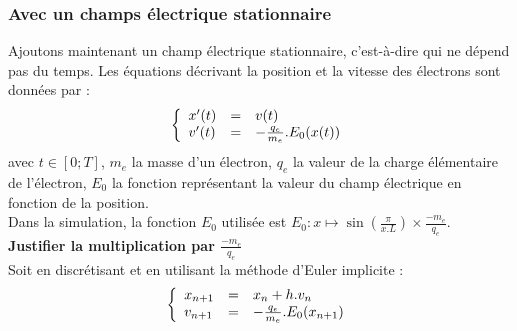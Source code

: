 \documentclass{article}
\begin{document}
\subsubsection*{Avec un champs électrique stationnaire}
Ajoutons maintenant un champ électrique stationnaire, c'est-à-dire qui ne dépend pas du temps. Les équations décrivant la position et la vitesse des électrons sont données par :
$$
\left \{
   \begin{array}{l l l}
      x'(t)  & = & v(t) \\
      v'(t)  & = & -\frac{q_e}{m_e}.E_0(x(t)) \\
	\end{array}
\right.
$$
avec $t \in [0;T]$, $m_e$ la masse d'un électron, $q_e$ la valeur de la charge élémentaire de l'électron, $E_0$ la fonction représentant la valeur du champ électrique en fonction de la position.\\
Dans la simulation, la fonction $E_0$ utilisée est $E_0 : x \mapsto \sin(\frac{\pi}{x.L}) \times \frac{-m_e}{q_e}$.\\
\textbf{Justifier la multiplication par $\frac{-m_e}{q_e}$}\\
Soit en discrétisant et en utilisant la méthode d'Euler implicite :
$$
\left \{
   \begin{array}{l l l}
      x_{n+1}  & = & x_n + h.v_n \\
      v_{n+1}  & = & -\frac{q_e}{m_e}.E_0(x_{n+1}) \\
	\end{array}
\right.
$$
\end{document}
